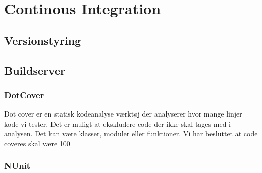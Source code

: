 \thispagestyle{fancy}
\chapter{Continous Integration}
\label{chp:contintegration}

\section{Versionstyring}
\section{Buildserver}
\subsection{DotCover}
Dot cover er en statisk kodeanalyse værktøj der analyserer hvor mange linjer kode vi tester.  Det er muligt at ekskludere code der ikke skal tages med i analysen. Det kan være klasser, moduler eller funktioner. Vi har besluttet at code coveres skal være 100 %
\subsection{NUnit}

